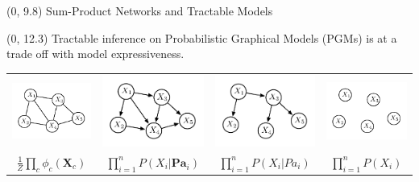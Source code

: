 \documentclass[final]{beamer}
\begin{document}
\begin{frame}{}
  
  \begin{textblock}{80}(0, 9.8)
    Sum-Product Networks and Tractable Models
  \end{textblock}
  
  
  \begin{textblock}{25.7}(0, 12.3)
    \small
    Tractable inference on Probabilistic Graphical Models (PGMs) is
    at a trade off with model expressiveness.
    \begin{table}[!ht]
      \centering
      \begin{tabular}{c c c c}
        
        \includegraphics[width=0.22\linewidth]{figures/mrf} &
        \includegraphics[width=0.22\linewidth]{figures/bn} &
        \includegraphics[width=0.22\linewidth]{figures/clt} &
        \includegraphics[width=0.22\linewidth]{figures/nf}\\                                                             
        \addlinespace[-0.2cm]
                                                                            
        \scriptsize  $\frac{1}{Z}\prod_{c}\phi_{c}(\mathbf{X}_{c})$ & 
        \scriptsize  $\prod_{i=1}^nP(X_{i}|\mathbf{Pa}_{i})$&
         \scriptsize $\prod_{i=1}^nP(X_{i}|Pa_{i})$ &
        \scriptsize $\prod_{i=1}^nP(X_{i})$                                                              
      \end{tabular}
    \end{table}
    

\end{textblock}
\end{frame}
\end{document}
